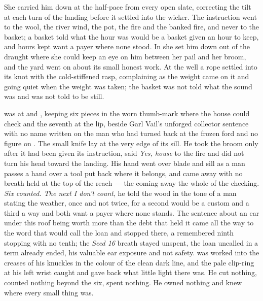 She carried him down  at the half-pace from every open slate, correcting the tilt at each turn of the landing before it settled into the wicker. The instruction went to the wool, the river wind, the pot, the fire and the banked fire, and never to the basket; a basket told what the hour was would be a basket given an hour to keep, and hours kept want a payer where none stood. In  she set him down out of the draught where she could keep an eye on him between her pail and her broom, and the yard went on about its small honest work. At the well a rope settled into its knot with the cold-stiffened rasp, complaining as the weight came on it and going quiet when the weight was taken; the basket was not told what the sound was and was not told to be still.

 was at  and , keeping six pieces in the worn thumb-mark where the house could check and the seventh at the lip, beside Garl Vail's unforged collector sentence with no name written on the man who had turned back at the frozen ford and no figure on . The small knife lay at the very edge of its sill. He took the broom only after it had been given its instruction, said \emph{Yes, house} to the fire and did not turn his head toward the landing. His hand went over blade and sill as a man passes a hand over a tool put back where it belongs, and came away with no breath held at the top of the reach --- the coming away the whole of the checking. \emph{Six counted. The next I don't count}, he told the wood in the tone of a man stating the weather, once and not twice, for a second would be a custom and a third a way and both want a payer where none stands. The sentence about an ear under this roof being worth more than the debt that held it came all the way to the word that would call the loan and stopped there, a remembered ninth stopping with no tenth; the \emph{Seed 16} breath stayed unspent, the loan uncalled in a term already ended, his valuable ear exposure and not safety.  was worked into the creases of his knuckles in the colour of the clean dark line, and the pale clip-ring at his left wrist caught and gave back what little light there was. He cut nothing, counted nothing beyond the six, spent nothing. He owned nothing and knew where every small thing was.

